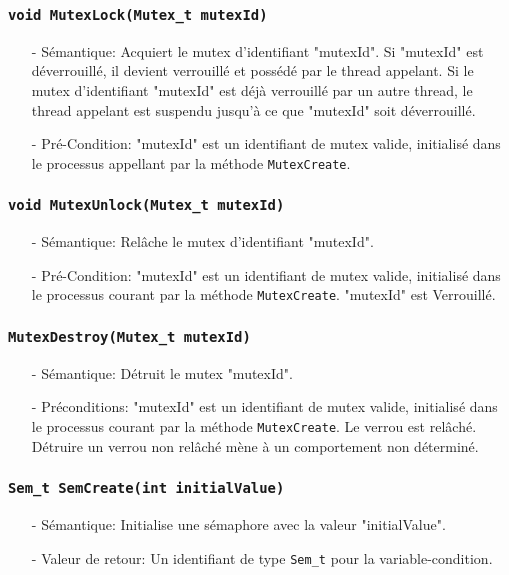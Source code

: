 \documentclass[11pt]{article}
\theoremstyle{definition}
\begin{document}
\subsubsection{\texttt{void MutexLock(Mutex\_t mutexId)}}
\begin{itemize}
\item[-]Sémantique: Acquiert le mutex d'identifiant "mutexId". Si "mutexId" est déverrouillé, il devient verrouillé
  et possédé par le thread appelant. Si le mutex d'identifiant "mutexId" est déjà verrouillé par un autre thread,
  le thread appelant est suspendu jusqu'à ce que "mutexId" soit déverrouillé.
\item[-]Pré-Condition: "mutexId" est un identifiant de mutex valide, initialisé dans le processus
  appellant par la méthode \texttt{MutexCreate}.
\end{itemize}

\subsubsection{\texttt{void MutexUnlock(Mutex\_t mutexId)}}
\begin{itemize}
\item[-]Sémantique: Relâche le mutex d'identifiant "mutexId".
\item[-]Pré-Condition: "mutexId" est un identifiant de mutex valide, initialisé dans le processus
  courant par la méthode \texttt{MutexCreate}. "mutexId" est Verrouillé.
\end{itemize}

\subsubsection{\texttt{MutexDestroy(Mutex\_t mutexId)}}
\begin{itemize}
\item[-]Sémantique: Détruit le mutex "mutexId".
\item[-]Préconditions: "mutexId" est un identifiant de mutex valide, initialisé dans le processus
  courant par la méthode \texttt{MutexCreate}.
  Le verrou est relâché. Détruire un verrou non relâché mène à un comportement
  non déterminé.
\end{itemize}

\subsubsection{\texttt{Sem\_t SemCreate(int initialValue)}}
\begin{itemize}
\item[-]Sémantique: Initialise une sémaphore avec la valeur "initialValue".
\item[-]Valeur de retour: Un identifiant de type \texttt{Sem\_t} pour la variable-condition.
\end{itemize}
\end{document}
